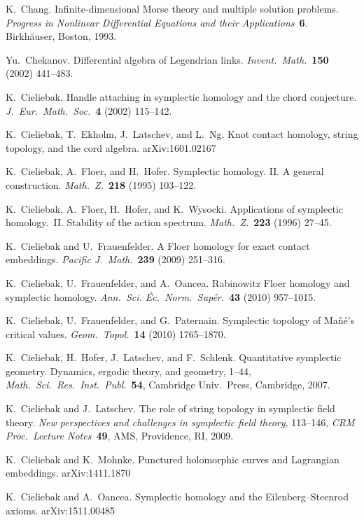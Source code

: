 \documentclass[12pt,twoside]{amsart}
\theoremstyle{plain}
\numberwithin{figure}{section}
\numberwithin{equation}{section}
\begin{document}
\begin{thebibliography}{999}
K.\ Chang.
Infinite-dimensional Morse theory and multiple solution problems. 
{\it Progress in Nonlinear Differential Equations and their Applications}~{\bf 6}. 
Birkh\"auser, Boston, 1993.

Yu.\ Chekanov.
Differential algebra of Legendrian links.
{\it Invent.\ Math.}~{\bf 150} (2002) 441--483. 

K.\ Cieliebak. 
Handle attaching in symplectic homology and the chord conjecture.
{\it J.\ Eur.\ Math.\ Soc.}~{\bf 4} (2002) 115--142. 

K.\ Cieliebak, T.\ Ekholm, J.\ Latschev, and L.\ Ng. 
Knot contact homology, string topology, and the cord algebra.
arXiv:1601.02167

K.\ Cieliebak, A.\ Floer, and H.\ Hofer. 
Symplectic homology. II. A general construction. 
{\it Math.\ Z.}~{\bf  218} (1995) 103--122.

K.\ Cieliebak, A.\ Floer, H.\ Hofer, and K.\ Wysocki.
Applications of symplectic homology.\ II. Stability of the action spectrum. 
{\it Math.\ Z.}~{\bf 223} (1996) 27--45.

K.~Cieliebak and U.~Frauenfelder. 
A Floer homology for exact contact embeddings. 
{\it Pacific J.~Math.}~{\bf 239} (2009) 251--316.


K.~Cieliebak, U.~Frauenfelder, and A.~Oancea. 
Rabinowitz Floer homology and symplectic homology. 
{\it Ann.\ Sci. \'Ec.\ Norm.\ Sup\'er.}~{\bf 43} (2010) 957--1015.

K.~Cieliebak, U.~Frauenfelder, and G.~Paternain. 
Symplectic topology of Ma\~n\'e's critical values. 
{\it Geom.\ Topol.}~{\bf 14} (2010) 1765--1870.

K.\ Cieliebak, H.\ Hofer, J.\ Latschev, and F.\ Schlenk.
Quantitative symplectic geometry. 
Dynamics, ergodic theory, and geometry, 1--44, 
{\it Math.\ Sci.\ Res.\ Inst.\ Publ.}~{\bf 54}, Cambridge Univ.\ Press, Cambridge, 2007.

K.\ Cieliebak and J.\ Latschev.
The role of string topology in symplectic field theory. 
{\it New perspectives and challenges in symplectic field theory}, 113--146, 
{\it CRM Proc.\ Lecture Notes}~{\bf 49}, AMS, Providence, RI, 2009.


K.\ Cieliebak and K.\ Mohnke. 
Punctured holomorphic curves and Lagrangian embeddings.
arXiv:1411.1870 

K.~Cieliebak and A.~Oancea. 
Symplectic homology and the Eilenberg--Steenrod axioms.
arXiv:1511.00485


\end{thebibliography}
\end{document}

